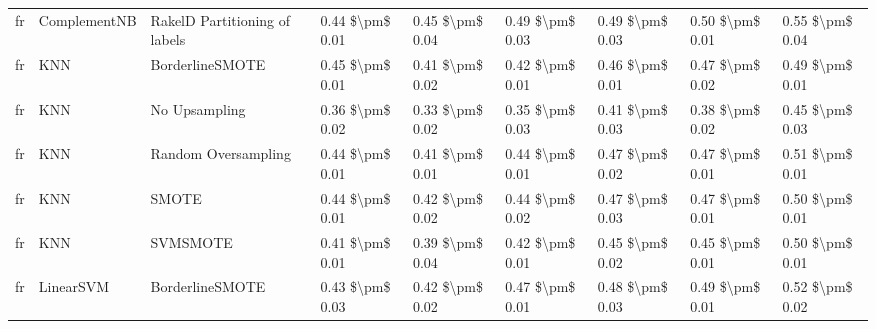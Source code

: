 \begin{tabular}{lllllllll}
      fr &                    ComplementNB & RakelD Partitioning of labels & 0.44 \$\textbackslash pm\$ 0.01 &           0.45 \$\textbackslash pm\$ 0.04 &       0.49 \$\textbackslash pm\$ 0.03 &        0.49 \$\textbackslash pm\$ 0.03 &                         0.50 \$\textbackslash pm\$ 0.01 &     0.55 \$\textbackslash pm\$ 0.04 \\
      fr &                             KNN &               BorderlineSMOTE & 0.45 \$\textbackslash pm\$ 0.01 &           0.41 \$\textbackslash pm\$ 0.02 &       0.42 \$\textbackslash pm\$ 0.01 &        0.46 \$\textbackslash pm\$ 0.01 &                         0.47 \$\textbackslash pm\$ 0.02 &     0.49 \$\textbackslash pm\$ 0.01 \\
      fr &                             KNN &                 No Upsampling & 0.36 \$\textbackslash pm\$ 0.02 &           0.33 \$\textbackslash pm\$ 0.02 &       0.35 \$\textbackslash pm\$ 0.03 &        0.41 \$\textbackslash pm\$ 0.03 &                         0.38 \$\textbackslash pm\$ 0.02 &     0.45 \$\textbackslash pm\$ 0.03 \\
      fr &                             KNN &           Random Oversampling & 0.44 \$\textbackslash pm\$ 0.01 &           0.41 \$\textbackslash pm\$ 0.01 &       0.44 \$\textbackslash pm\$ 0.01 &        0.47 \$\textbackslash pm\$ 0.02 &                         0.47 \$\textbackslash pm\$ 0.01 &     0.51 \$\textbackslash pm\$ 0.01 \\
      fr &                             KNN &                         SMOTE & 0.44 \$\textbackslash pm\$ 0.01 &           0.42 \$\textbackslash pm\$ 0.02 &       0.44 \$\textbackslash pm\$ 0.02 &        0.47 \$\textbackslash pm\$ 0.03 &                         0.47 \$\textbackslash pm\$ 0.01 &     0.50 \$\textbackslash pm\$ 0.01 \\
      fr &                             KNN &                      SVMSMOTE & 0.41 \$\textbackslash pm\$ 0.01 &           0.39 \$\textbackslash pm\$ 0.04 &       0.42 \$\textbackslash pm\$ 0.01 &        0.45 \$\textbackslash pm\$ 0.02 &                         0.45 \$\textbackslash pm\$ 0.01 &     0.50 \$\textbackslash pm\$ 0.01 \\
      fr &                       LinearSVM &               BorderlineSMOTE & 0.43 \$\textbackslash pm\$ 0.03 &           0.42 \$\textbackslash pm\$ 0.02 &       0.47 \$\textbackslash pm\$ 0.01 &        0.48 \$\textbackslash pm\$ 0.03 &                         0.49 \$\textbackslash pm\$ 0.01 &     0.52 \$\textbackslash pm\$ 0.02 \\

\end{tabular}
